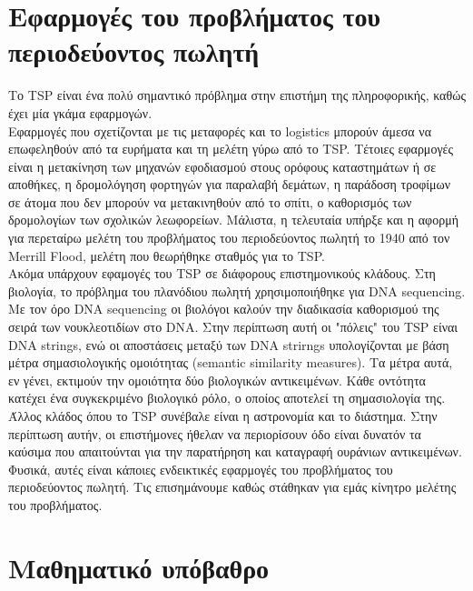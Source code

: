 \documentclass[oneside,12pt]{book}
\theoremstyle{definition}
\begin{document}
\chapter{Εφαρμογές του προβλήματος του περιοδεύοντος πωλητή}

Το TSP είναι ένα πολύ σημαντικό πρόβλημα στην επιστήμη της πληροφορικής, καθώς έχει μία γκάμα εφαρμογών. \\

Εφαρμογές που σχετίζονται με τις μεταφορές και το logistics μπορούν άμεσα να επωφεληθούν από τα ευρήματα και τη μελέτη γύρω από το TSP. Τέτοιες εφαρμογές είναι η μετακίνηση των μηχανών εφοδιασμού στους ορόφους καταστημάτων ή σε αποθήκες, η δρομολόγηση φορτηγών για παραλαβή δεμάτων, η παράδοση τροφίμων σε άτομα που δεν μπορούν να μετακινηθούν από το σπίτι, ο καθορισμός των δρομολογίων των σχολικών λεωφορείων. Μάλιστα, η τελευταία υπήρξε και η αφορμή για περεταίρω μελέτη του προβλήματος του περιοδεύοντος πωλητή το 1940 από τον Merrill Flood, μελέτη που θεωρήθηκε σταθμός για το TSP. \\

Ακόμα υπάρχουν εφαμογές του TSP σε διάφορους επιστημονικούς κλάδους. Στη βιολογία, το πρόβλημα του πλανόδιου πωλητή χρησιμοποιήθηκε για DNA sequencing. Με τον όρο DNA sequencing οι βιολόγοι καλούν την διαδικασία καθορισμού της σειρά των νουκλεοτιδίων στο DNA. Στην περίπτωση αυτή οι "πόλεις" του TSP είναι DNA strings, ενώ οι αποστάσεις μεταξύ των DNA strirngs υπολογίζονται με βάση μέτρα σημασιολογικής ομοιότητας (semantic similarity measures). Τα μέτρα αυτά, εν γένει, εκτιμούν την ομοιότητα δύο βιολογικών αντικειμένων.  Κάθε οντότητα κατέχει ένα συγκεκριμένο βιολογικό ρόλο, ο οποίος αποτελεί τη σημασιολογία της. \\

Άλλος κλάδος όπου το TSP συνέβαλε είναι η αστρονομία και το διάστημα. Στην περίπτωση αυτήν, οι επιστήμονες ήθελαν να περιορίσουν όδο είναι δυνατόν τα καύσιμα που απαιτούνται για την παρατήρηση και καταγραφή ουράνιων αντικειμένων. \\

Φυσικά, αυτές είναι κάποιες ενδεικτικές εφαρμογές του προβλήματος του περιοδεύοντος πωλητή. Τις επισημάνουμε καθώς στάθηκαν για εμάς κίνητρο μελέτης του προβλήματος. \\ 

\chapter{Μαθηματικό υπόβαθρο}
\end{document}
